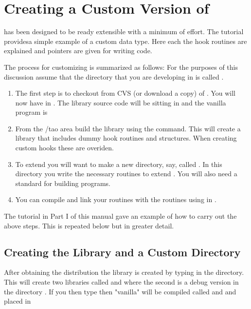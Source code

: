 
\chapter{Creating a Custom Version of \tao}
\label{c:prog_customizing} 

\tao has been designed to be ready extensible with a minimum of
effort. The tutorial providesa simple example of a custom data type. Here each
the hook routines are explained and pointers are given for writing code. 

The process for customizing is summarized as follows: For the purposes of this
discussion assume that the directory that you are developing \tao in
is called . 
\begin{enumerate}
\item 
The first step is to checkout from CVS (or download a
copy) of \tao. You will now have \tao in
. The library source code will be sitting in 
and the vanilla \tao program is 
\item 
From the /tao area build the \tao library using the
 command. This will create a \tao library that includes dummy hook
routines and structures. When creating custom hooks these are overiden.
\item
To extend \tao you will want to make a new
directory, say, called . In this directory you write
the necessary routines to extend \tao. You will also need a standard 
 for building programs.
\item
You can compile and link your routines with the \tao routines using
 in .
\end{enumerate}

The tutorial in Part I of this manual gave an example of how to carry out the
above steps. This is repeated below but in greater detail.

\section{Creating the \tao Library and a Custom \tao Directory}

After obtaining the \tao distribution the \tao library is created by typing 
 in the  directory. This will create two libraries
called  and  where the second is a debug version
in the directory . If you then type  then
"vanilla" \tao will be compiled called  and  and placed in


